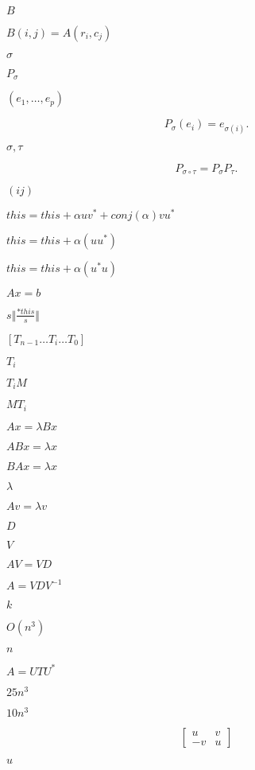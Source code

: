 \documentclass{article}
\begin{document}
$ B $
\pagebreak

$ B(i,j) = A(r_i,c_j) $
\pagebreak

$ \sigma $
\pagebreak

$ P_\sigma $
\pagebreak

$ (e_1,\ldots,e_p) $
\pagebreak

\[ P_\sigma(e_i) = e_{\sigma(i)}. \]
\pagebreak

$ \sigma, \tau $
\pagebreak

\[ P_{\sigma\circ\tau} = P_\sigma P_\tau. \]
\pagebreak

$(ij)$
\pagebreak

$ this = this + \alpha u v^* + conj(\alpha) v u^* $
\pagebreak

$ this = this + \alpha ( u u^* ) $
\pagebreak

$ this = this + \alpha ( u^* u ) $
\pagebreak

$ A x = b $
\pagebreak

$ s \Vert \frac{*this}{s} \Vert $
\pagebreak

$[T_{n-1} \ldots T_{i} \ldots T_{0}]$
\pagebreak

$ T_{i} $
\pagebreak

$ T_{i} M$
\pagebreak

$ M T_{i}$
\pagebreak

$ Ax = \lambda B x $
\pagebreak

$ ABx = \lambda x $
\pagebreak

$ BAx = \lambda x $
\pagebreak

$ \lambda $
\pagebreak

$ Av = \lambda v $
\pagebreak

$ D $
\pagebreak

$ V $
\pagebreak

$ A V = V D $
\pagebreak

$ A = V D V^{-1} $
\pagebreak

$ k $
\pagebreak

$ O(n^3) $
\pagebreak

$ n $
\pagebreak

$ A = U T U^*$
\pagebreak

$25n^3$
\pagebreak

$10n^3$
\pagebreak

\[ \begin{bmatrix} u & v \\ -v & u \end{bmatrix} \]
\pagebreak

$ u $
\pagebreak
\end{document}
